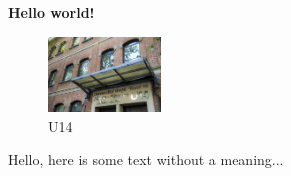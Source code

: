 \documentclass[../main.tex]{subfiles}
\begin{document}
\textbf{Hello world!}
\begin{figure}[bh]
\centering
\includegraphics[width=3cm]{../images/u14.jpg}

\label{fig:img1}
\caption{U14}
\end{figure}

Hello, here is some text without a meaning...
\end{document}
